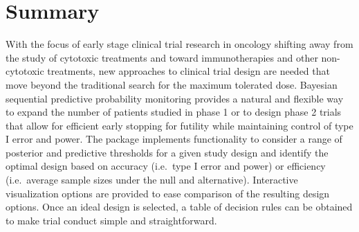 \hypertarget{summary}{%
\section{Summary}\label{summary}}

With the focus of early stage clinical trial research in oncology
shifting away from the study of cytotoxic treatments and toward
immunotherapies and other non-cytotoxic treatments, new approaches to
clinical trial design are needed that move beyond the traditional search
for the maximum tolerated dose. Bayesian sequential predictive
probability monitoring provides a natural and flexible way to expand the
number of patients studied in phase 1 or to design phase 2 trials that
allow for efficient early stopping for futility while maintaining
control of type I error and power. The  package implements
functionality to consider a range of posterior and predictive thresholds
for a given study design and identify the optimal design based on
accuracy (i.e.~type I error and power) or efficiency (i.e.~average
sample sizes under the null and alternative). Interactive visualization
options are provided to ease comparison of the resulting design options.
Once an ideal design is selected, a table of decision rules can be
obtained to make trial conduct simple and straightforward.



\address{%
Emily C. Zabor\\
Department of Quantitative Health Sciences \& Taussig Cancer Institute,
Cleveland Clinic\\%
9500 Euclid Ave. CA-60\\ Cleveland, OH 44195 USA\\
%
\url{http://www.emilyzabor.com/}\\%
\textit{ORCiD: \href{https://orcid.org/0000-0002-1402-4498}{0000-0002-1402-4498}}\\%
\href{mailto:zabore2@ccf.org}{\nolinkurl{zabore2@ccf.org}}%
}

\address{%
Brian P. Hobbs\\
Dell Medical School, The University of Texas at Austin\\%
true\\ Austin, TX 78712\\
%
%
\textit{ORCiD: \href{https://orcid.org/0000-0003-2189-5846}{0000-0003-2189-5846}}\\%
\href{mailto:brian.hobbs@austin.utexas.edu}{\nolinkurl{brian.hobbs@austin.utexas.edu}}%
}

\address{%
Michael J. Kane\\
Department of Biostatistics, Yale University\\%
22 Mill Pond Drive\\ Guilford, CT 06437\\
%
%
\textit{ORCiD: \href{https://orcid.org/0000-0003-1899-6662}{0000-0003-1899-6662}}\\%
\href{mailto:michael.kane@yale.edu}{\nolinkurl{michael.kane@yale.edu}}%
}
